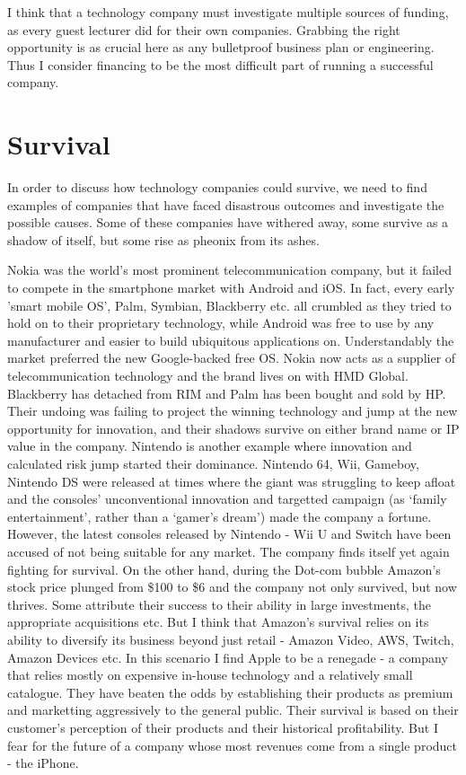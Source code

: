 \documentclass[twocolumn]{bmcart}%
\begin{document}
\par I think that a technology company must investigate multiple sources of funding, as every guest lecturer did for their own companies. Grabbing the right opportunity is as crucial here as any bulletproof business plan or engineering. Thus I consider financing to be the most difficult part of running a successful company.

\section*{Survival}

In order to discuss how technology companies could survive, we need to find examples of companies that have faced disastrous outcomes and investigate the possible causes. Some of these companies have withered away, some survive as a shadow of itself, but some rise as pheonix from its ashes.\\

\par Nokia was the world's most prominent telecommunication company, but it failed to compete in the smartphone market with Android and iOS. In fact, every early 'smart mobile OS', Palm, Symbian, Blackberry etc. all crumbled as they tried to hold on to their proprietary technology, while Android was free to use by any manufacturer and easier to build ubiquitous applications on. Understandably the market preferred the new Google-backed free OS. Nokia now acts as a supplier of telecommunication technology and the brand lives on with HMD Global. Blackberry has detached from RIM and Palm has been bought and sold by HP. Their undoing was failing to project the winning technology and jump at the new opportunity for innovation, and their shadows survive on either brand name or IP value in the company. Nintendo is another example where innovation and calculated risk jump started their dominance. Nintendo 64, Wii, Gameboy, Nintendo DS were released at times where the giant was struggling to keep afloat and the consoles' unconventional innovation and targetted campaign (as `family entertainment', rather than a `gamer's dream') made the company a fortune. However, the latest consoles released by Nintendo - Wii U and Switch have been accused of not being suitable for any market. The company finds itself yet again fighting for survival. On the other hand, during the Dot-com bubble Amazon's stock price plunged from \$100 to \$6 and the company not only survived, but now thrives. Some attribute their success to their ability in large investments, the appropriate acquisitions etc. But I think that Amazon's survival relies on its ability to diversify its business beyond just retail - Amazon Video, AWS, Twitch, Amazon Devices etc. In this scenario I find Apple to be a renegade - a company that relies mostly on expensive in-house technology and a relatively small catalogue. They have beaten the odds by establishing their products as premium and marketting aggressively to the general public. Their survival is based on their customer's perception of their products and their historical profitability. But I fear for the future of a company whose most revenues come from a single product - the iPhone.\\
\end{document}
